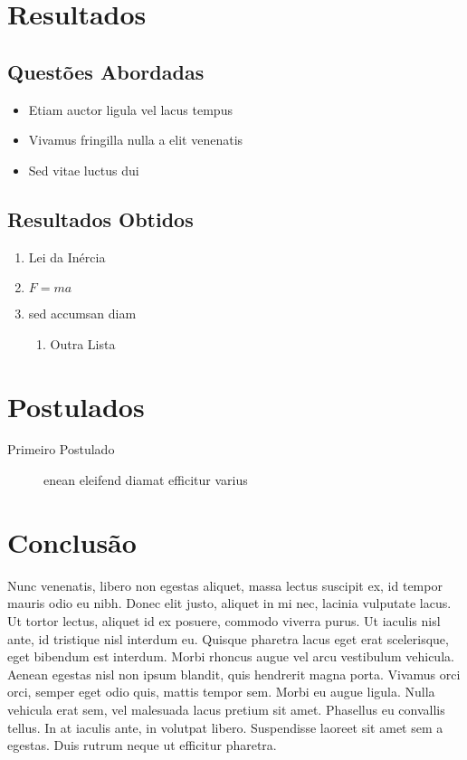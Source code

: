 \documentclass[11pt, a4paper]{article}
\begin{document}
\begin{multicols}{2}
    \section{Resultados}
    \subsection{Questões Abordadas}
    
    \begin{itemize}
        \item Etiam auctor ligula vel lacus tempus
        \item Vivamus fringilla nulla a elit venenatis
        \item Sed vitae luctus dui
    \end{itemize}
    
    \subsection{Resultados Obtidos}
    \begin{enumerate}
        \item Lei da Inércia
        \item $F=ma$
        \item sed accumsan diam
        \begin{enumerate}
            \item Outra Lista
        \end{enumerate}
    \end{enumerate}
 
 \section{Postulados}
 \begin{description}
    \item[Primeiro Postulado] enean eleifend diamat efficitur varius
 \end{description}
 
 \section{Conclusão}
  Nunc venenatis, libero non egestas aliquet, massa lectus suscipit ex, id tempor mauris odio eu nibh. Donec elit justo, aliquet in mi nec, lacinia vulputate lacus. Ut tortor lectus, aliquet id ex posuere, commodo viverra purus. Ut iaculis nisl ante, id tristique nisl interdum eu. Quisque pharetra lacus eget erat scelerisque, eget bibendum est interdum. Morbi rhoncus augue vel arcu vestibulum vehicula. Aenean egestas nisl non ipsum blandit, quis hendrerit magna porta. Vivamus orci orci, semper eget odio quis, mattis tempor sem. Morbi eu augue ligula. Nulla vehicula erat sem, vel malesuada lacus pretium sit amet. Phasellus eu convallis tellus. In at iaculis ante, in volutpat libero. Suspendisse laoreet sit amet sem a egestas. Duis rutrum neque ut efficitur pharetra.
  
    \nocite{johntaylor2005}
    
    
    \end{multicols}
 
\end{document}
